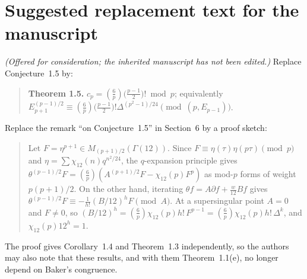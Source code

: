 \documentclass[11pt,a4paper]{article}
\numberwithin{equation}{section}
\theoremstyle{definition}
\theoremstyle{remark}
\newcommand{\Lp}[1]{\left(\frac{#1}{p}\right)}
\begin{document}
\section{Suggested replacement text for the manuscript}\label{sec:replace}
\emph{(Offered for consideration; the inherited manuscript has not been edited.)}
Replace Conjecture~1.5 by:
\begin{quote}\small
\textbf{Theorem 1.5.} $c_p=\Lp6\bigl(\frac{p-1}2\bigr)!\bmod p$; equivalently
$E_{p+1}^{(p-1)/2}\equiv\Lp6\bigl(\frac{p-1}2\bigr)!\Delta^{(p^2-1)/24}\pmod{(p,E_{p-1})}$.
\end{quote}
Replace the remark ``on Conjecture~1.5'' in Section~6 by a proof sketch:
\begin{quote}\small
Let $F=\eta^{p+1}\in M_{(p+1)/2}(\Gamma(12))$. Since $F\equiv\eta(\tau)\eta(p\tau)\pmod p$ and
$\eta=\sum\chi_{12}(n)q^{n^2/24}$, the $q$-expansion principle gives
$\theta^{(p-1)/2}F=\Lp6(A^{(p+1)/2}F-\chi_{12}(p)F^p)$ as mod-$p$ forms of weight
$p(p+1)/2$. On the other hand, iterating $\theta f=A\partial f+\frac w{12}Bf$ gives
$\theta^{(p-1)/2}F\equiv-\frac{1}{h!}(B/12)^{h}F\pmod A$. At a supersingular point $A=0$ and
$F\ne0$, so $(B/12)^h=\Lp6\chi_{12}(p)h!\,F^{p-1}=\Lp6\chi_{12}(p)h!\,\Delta^k$, and
$\chi_{12}(p)12^h=1$.
\end{quote}
The proof gives Corollary~1.4 and Theorem~1.3 independently, so the authors may also note
that these results, and with them Theorem~1.1(e), no longer depend on Baker's congruence.
\end{document}
